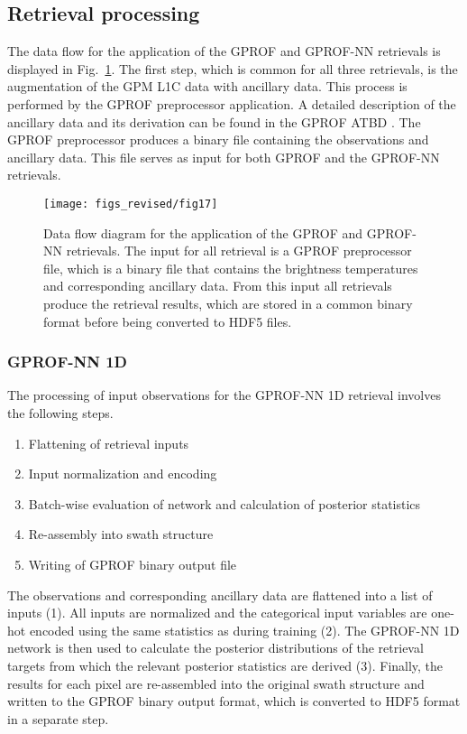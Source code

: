 \documentclass[journal abbreviation, manuscript]{copernicus}
\begin{document}
\subsection{Retrieval processing}     %
\label{sec:gprof_nn_processing}

The data flow for the application of the GPROF and GPROF-NN retrievals is
displayed in Fig.~\ref{fig:data_flow_application}. The first step, which is
common for all three retrievals, is the augmentation of the GPM L1C data with
ancillary data. This process is performed by the GPROF preprocessor application.
A detailed description of the ancillary data and its derivation can be found in
the GPROF ATBD \citep{atbd}. The GPROF preprocessor produces a binary file
containing the observations and ancillary data. This file serves as input for
both GPROF and the GPROF-NN retrievals.

\begin{figure}
  \centering
  \texttt{[image: figs\_revised/fig17]}
  \caption{
    Data flow diagram for the application of the GPROF and GPROF-NN retrievals.
    The input for all retrieval is a GPROF preprocessor file, which is a binary file that
    contains the brightness temperatures and corresponding ancillary data. From this input
    all retrievals produce the retrieval results, which are stored in a common binary
    format before being converted to HDF5 files.
  }
  \label{fig:data_flow_application}
\end{figure}

\subsubsection{GPROF-NN 1D}

The processing of input observations for the GPROF-NN 1D retrieval involves the
following steps.

\begin{enumerate}
  \item Flattening of retrieval inputs
  \item Input normalization and encoding
  \item Batch-wise evaluation of network and calculation of posterior statistics 
  \item Re-assembly into swath structure
  \item Writing of GPROF binary output file
\end{enumerate}

The observations and corresponding ancillary data are flattened into a list of
inputs (1). All inputs are normalized and the categorical input variables are
one-hot encoded using the same statistics as during training (2). The GPROF-NN
1D network is then used to calculate the posterior distributions of the
retrieval targets from which the relevant posterior statistics are derived
(3). Finally, the results for each pixel are re-assembled into the original
swath structure and written to the GPROF binary output format, which is
 converted to HDF5 format in a separate step.
\end{document}

